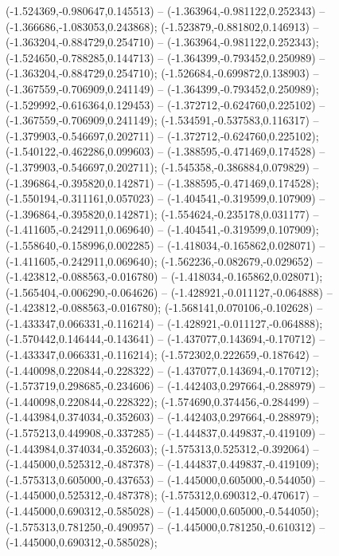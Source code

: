 (-1.524369,-0.980647,0.145513) -- (-1.363964,-0.981122,0.252343) -- (-1.366686,-1.083053,0.243868);
 (-1.523879,-0.881802,0.146913) -- (-1.363204,-0.884729,0.254710) -- (-1.363964,-0.981122,0.252343);
 (-1.524650,-0.788285,0.144713) -- (-1.364399,-0.793452,0.250989) -- (-1.363204,-0.884729,0.254710);
 (-1.526684,-0.699872,0.138903) -- (-1.367559,-0.706909,0.241149) -- (-1.364399,-0.793452,0.250989);
 (-1.529992,-0.616364,0.129453) -- (-1.372712,-0.624760,0.225102) -- (-1.367559,-0.706909,0.241149);
 (-1.534591,-0.537583,0.116317) -- (-1.379903,-0.546697,0.202711) -- (-1.372712,-0.624760,0.225102);
 (-1.540122,-0.462286,0.099603) -- (-1.388595,-0.471469,0.174528) -- (-1.379903,-0.546697,0.202711);
 (-1.545358,-0.386884,0.079829) -- (-1.396864,-0.395820,0.142871) -- (-1.388595,-0.471469,0.174528);
 (-1.550194,-0.311161,0.057023) -- (-1.404541,-0.319599,0.107909) -- (-1.396864,-0.395820,0.142871);
 (-1.554624,-0.235178,0.031177) -- (-1.411605,-0.242911,0.069640) -- (-1.404541,-0.319599,0.107909);
 (-1.558640,-0.158996,0.002285) -- (-1.418034,-0.165862,0.028071) -- (-1.411605,-0.242911,0.069640);
 (-1.562236,-0.082679,-0.029652) -- (-1.423812,-0.088563,-0.016780) -- (-1.418034,-0.165862,0.028071);
 (-1.565404,-0.006290,-0.064626) -- (-1.428921,-0.011127,-0.064888) -- (-1.423812,-0.088563,-0.016780);
 (-1.568141,0.070106,-0.102628) -- (-1.433347,0.066331,-0.116214) -- (-1.428921,-0.011127,-0.064888);
 (-1.570442,0.146444,-0.143641) -- (-1.437077,0.143694,-0.170712) -- (-1.433347,0.066331,-0.116214);
 (-1.572302,0.222659,-0.187642) -- (-1.440098,0.220844,-0.228322) -- (-1.437077,0.143694,-0.170712);
 (-1.573719,0.298685,-0.234606) -- (-1.442403,0.297664,-0.288979) -- (-1.440098,0.220844,-0.228322);
 (-1.574690,0.374456,-0.284499) -- (-1.443984,0.374034,-0.352603) -- (-1.442403,0.297664,-0.288979);
 (-1.575213,0.449908,-0.337285) -- (-1.444837,0.449837,-0.419109) -- (-1.443984,0.374034,-0.352603);
 (-1.575313,0.525312,-0.392064) -- (-1.445000,0.525312,-0.487378) -- (-1.444837,0.449837,-0.419109);
 (-1.575313,0.605000,-0.437653) -- (-1.445000,0.605000,-0.544050) -- (-1.445000,0.525312,-0.487378);
 (-1.575312,0.690312,-0.470617) -- (-1.445000,0.690312,-0.585028) -- (-1.445000,0.605000,-0.544050);
 (-1.575313,0.781250,-0.490957) -- (-1.445000,0.781250,-0.610312) -- (-1.445000,0.690312,-0.585028);

